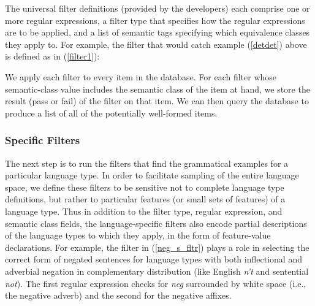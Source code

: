 \documentclass[11pt]{article}
\begin{document}

The universal filter definitions (provided by the developers)
each comprise one or more regular expressions, a filter type that
specifies how the regular expressions are to be applied, and a list of
semantic tags specifying which equivalence classes they apply to.  For
example, the filter that would catch example (\ref{detdet}) above
is defined as in (\ref{filter1}):

%
We apply each filter to every item in the database.  For each filter whose semantic-class value
includes the semantic class of the item at hand, we store the result
(pass or fail) of the filter on that item.  We can then query the database to produce a list of all of the
potentially well-formed items. %

\subsubsection{Specific Filters}

The next step is to run the filters that find the grammatical
examples for a particular language type.  In order to facilitate
sampling of the entire language space, we define these filters to be
sensitive not to complete language type definitions, but rather to
particular features (or small sets of features) of a language type.
Thus in addition to the filter type, regular expression, and semantic
class fields, the language-specific filters also encode partial
descriptions  of the language types to which they 
apply, in the form of feature-value declarations.  For example, the filter in (\ref{neg_s_fltr})
plays a role in selecting the correct form of negated sentences for
language types with both inflectional and adverbial negation
in complementary distribution (like English {\it n't}
and sentential {\it not}).  The first regular expression checks for
{\it neg} surrounded by white space (i.e., the negative adverb) and the
second for the negative affixes.
\end{document}
